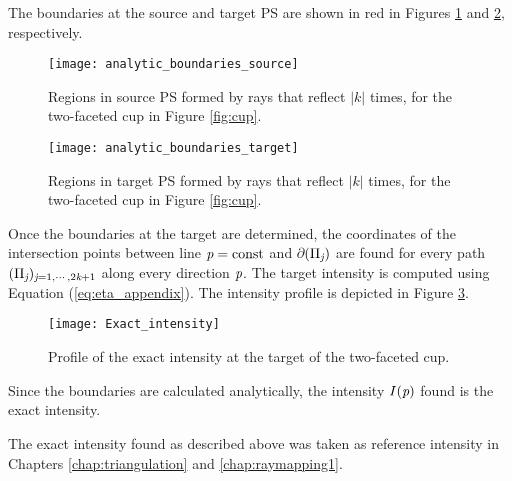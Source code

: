 The boundaries at the source and target PS are shown in red in Figures \ref{fig:boundary} and \ref{boundaries_target}, respectively. 
\begin{figure}[htbp]
\centering
\texttt{[image: analytic\_boundaries\_source]}
\caption{Regions in source PS formed by rays that reflect $|k|$ times, for the two-faceted cup in Figure \ref{fig:cup}.}
\label{fig:boundary}
\end{figure}
\begin{figure}[htbp]
\centering
\texttt{[image: analytic\_boundaries\_target]}
\caption{Regions in target PS formed by rays that reflect $|k|$ times, for the two-faceted cup in Figure \ref{fig:cup}.}
\label{boundaries_target}
\end{figure}
Once the boundaries at the target are determined, the coordinates of the intersection points between line $\textit{p}=\textrm{const}$ and $\partial$$(\Pi_{\textit{j}})$ are found for every path $(\Pi_{\textit{j}})_{\textit{j}=1, \cdots, 2\textit{k}+1}$ along every direction $\textit{p}$. The target intensity is computed using Equation (\ref{eq:eta_appendix}). The intensity profile is depicted in Figure \ref{fig:intensity_cup_analytic}. 
\begin{figure}[htbp]
\centering
\texttt{[image: Exact\_intensity]}
\caption{Profile of the exact intensity at the target of the two-faceted cup.}
\label{fig:intensity_cup_analytic}
\end{figure}
Since the boundaries are calculated analytically, the intensity $I(\textit{p})$ found is the exact intensity.

The exact intensity found as described above was taken as reference intensity in Chapters \ref{chap:triangulation} and \ref{chap:raymapping1}.

